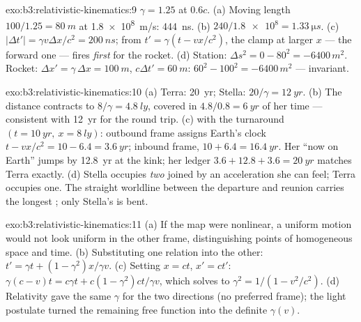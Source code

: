 \begin{solution}{exo:b3:relativistic-kinematics:9}
$\gamma = 1.25$ at $0.6c$. (a) Moving length $100/1.25 = \qty{80}{m}$
at \qty{1.8e8}{m/s}: \qty{444}{ns}. (b) $240/\num{1.8e8} =
\qty{1.33}{\micro s}$. (c) $|\Delta t'| = \gamma v\Delta x/c^2 =
\qty{200}{ns}$; from $t' = \gamma(t - vx/c^2)$, the clamp at larger
$x$ --- the forward one --- fires \emph{first} for the rocket. (d)
Station: $\Delta s^2 = 0 - 80^2 = -6400\,\unit{m^2}$. Rocket: $\Delta
x' = \gamma\,\Delta x = \qty{100}{m}$, $c\Delta t' = \qty{60}{m}$:
$60^2 - 100^2 = -6400\,\unit{m^2}$ --- invariant.
\end{solution}

\begin{solution}{exo:b3:relativistic-kinematics:10}
(a) Terra: \qty{20}{yr}; Stella: $20/\gamma = \qty{12}{yr}$. (b) The
distance contracts to $8/\gamma = \qty{4.8}{ly}$, covered in $4.8/0.8
= \qty{6}{yr}$ of her time --- consistent with \qty{12}{yr} for the
round trip. (c)  with the turnaround  $(t =
\qty{10}{yr},\ x = \qty{8}{ly})$: outbound frame assigns Earth's
clock $t - vx/c^2 = 10 - 6.4 = \qty{3.6}{yr}$; inbound frame, $10 +
6.4 = \qty{16.4}{yr}$. Her ``now on Earth'' jumps by \qty{12.8}{yr}
at the kink; her ledger $3.6 + 12.8 + 3.6 = \qty{20}{yr}$ matches
Terra exactly. (d) Stella occupies \emph{two}  joined
by an acceleration she can feel; Terra occupies one. The straight
worldline between the departure and reunion  carries the longest
; only Stella's is bent.
\end{solution}

\begin{solution}{exo:b3:relativistic-kinematics:11}
(a) If the map were nonlinear, a uniform motion would not look uniform
in the other frame, distinguishing points of homogeneous space and
time. (b) Substituting one relation into the other: $t' = \gamma t +
(1 - \gamma^2)x/\gamma v$. (c) Setting $x = ct$, $x' = ct'$:
$\gamma(c - v)t = c\gamma t + c(1 - \gamma^2)ct/\gamma v$, which
solves to $\gamma^2 = 1/(1 - v^2/c^2)$. (d) Relativity gave the same
$\gamma$ for the two directions (no preferred frame); the light
postulate turned the remaining free function into the definite
$\gamma(v)$.
\end{solution}

